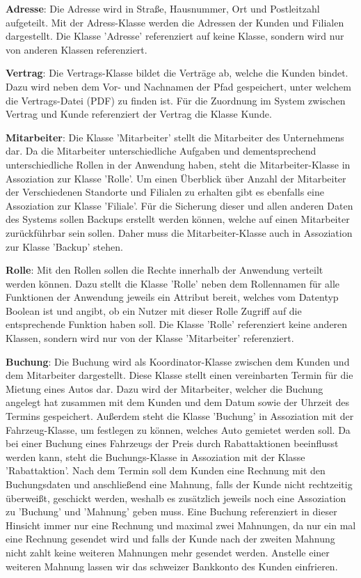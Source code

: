 \textbf{Adresse}: Die Adresse wird in Straße, Hausnummer, Ort und Postleitzahl aufgeteilt. Mit der Adress-Klasse werden die Adressen der Kunden und Filialen dargestellt. Die Klasse 'Adresse' referenziert auf keine Klasse, sondern wird nur von anderen Klassen referenziert.

\textbf{Vertrag}: Die Vertrags-Klasse bildet die Verträge ab, welche die Kunden bindet. Dazu wird neben dem Vor- und Nachnamen der Pfad gespeichert, unter welchem die Vertrags-Datei (PDF) zu finden ist. Für die Zuordnung im System zwischen Vertrag und Kunde referenziert der Vertrag die Klasse Kunde.

\textbf{Mitarbeiter}: Die Klasse 'Mitarbeiter' stellt die Mitarbeiter des Unternehmens dar. Da die Mitarbeiter unterschiedliche Aufgaben und dementsprechend unterschiedliche Rollen in der Anwendung haben, steht die Mitarbeiter-Klasse in Assoziation zur Klasse 'Rolle'. Um einen Überblick über Anzahl der Mitarbeiter der Verschiedenen Standorte und Filialen zu erhalten gibt es ebenfalls eine Assoziation zur Klasse 'Filiale'. Für die Sicherung dieser und allen anderen Daten des Systems sollen Backups erstellt werden können, welche auf einen Mitarbeiter zurückführbar sein sollen. Daher muss die Mitarbeiter-Klasse auch in Assoziation zur Klasse 'Backup' stehen.

\textbf{Rolle}: Mit den Rollen sollen die Rechte innerhalb der Anwendung verteilt werden können. Dazu stellt die Klasse 'Rolle' neben dem Rollennamen für alle Funktionen der Anwendung jeweils ein Attribut bereit, welches vom Datentyp Boolean ist und angibt, ob ein Nutzer mit dieser Rolle Zugriff auf die entsprechende Funktion haben soll. Die Klasse 'Rolle' referenziert keine anderen Klassen, sondern wird nur von der Klasse 'Mitarbeiter' referenziert.

\textbf{Buchung}: Die Buchung wird als Koordinator-Klasse zwischen dem Kunden und dem Mitarbeiter dargestellt. Diese Klasse stellt einen vereinbarten Termin für die Mietung eines Autos dar. Dazu wird der Mitarbeiter, welcher die Buchung angelegt hat zusammen mit dem Kunden und dem Datum sowie der Uhrzeit des Termins gespeichert. Außerdem steht die Klasse 'Buchung' in Assoziation mit der Fahrzeug-Klasse, um festlegen zu können, welches Auto gemietet werden soll. Da bei einer Buchung eines Fahrzeugs der Preis durch Rabattaktionen beeinflusst werden kann, steht die Buchungs-Klasse in Assoziation mit der Klasse 'Rabattaktion'. Nach dem Termin soll dem Kunden eine Rechnung mit den Buchungsdaten und anschließend eine Mahnung, falls der Kunde nicht rechtzeitig überweißt, geschickt werden, weshalb es zusätzlich jeweils noch eine Assoziation zu 'Buchung' und 'Mahnung' geben muss.
Eine Buchung referenziert in dieser Hinsicht immer nur eine Rechnung und maximal zwei Mahnungen, da nur ein mal eine Rechnung gesendet wird und falls der Kunde nach der zweiten Mahnung nicht zahlt keine weiteren Mahnungen mehr gesendet werden. Anstelle einer weiteren Mahnung lassen wir das schweizer Bankkonto des Kunden einfrieren.

